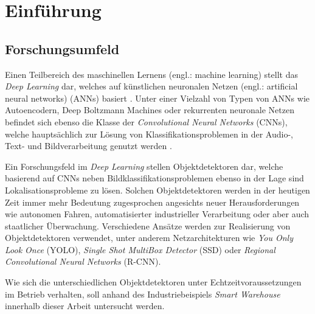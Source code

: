 \chapter{Einführung}

\section{Forschungsumfeld}

Einen Teilbereich des maschinellen Lernens (engl.: machine learning) stellt das \textit{Deep Learning} dar, welches auf künstlichen neuronalen Netzen (engl.: artificial neural networks) (ANNs) basiert \cite[S. 253]{AurelienGeron.2018}. Unter einer Vielzahl von Typen von ANNs wie Autoencodern, Deep Boltzmann Machines oder rekurrenten neuronale Netzen befindet sich ebenso die Klasse der \textit{Convolutional Neural Networks} (CNNs), welche hauptsächlich zur Lösung von Klassifikationsproblemen in der Audio-, Text- und Bildverarbeitung genutzt werden \cite{MathWorks.2019}.

Ein Forschungsfeld im \textit{Deep Learning} stellen Objektdetektoren dar, welche basierend auf CNNs neben Bildklassifikationsproblemen ebenso in der Lage sind Lokalisationsprobleme zu lösen. Solchen Objektdetektoren werden in der heutigen Zeit immer mehr Bedeutung zugesprochen angesichts neuer Herausforderungen wie autonomen Fahren, automatisierter industrieller Verarbeitung oder aber auch staatlicher Überwachung. Verschiedene Ansätze werden zur Realisierung von Objektdetektoren verwendet, unter anderem Netzarchitekturen wie \textit{You Only Look Once} (YOLO), \textit{Single Shot MultiBox Detector} (SSD) oder \textit{Regional Convolutional Neural Networks} (R-CNN). 

Wie sich die unterschiedlichen Objektdetektoren unter Echtzeitvoraussetzungen im Betrieb verhalten, soll anhand des Industriebeispiels \textit{Smart Warehouse} innerhalb dieser Arbeit untersucht werden. 

\newpage

